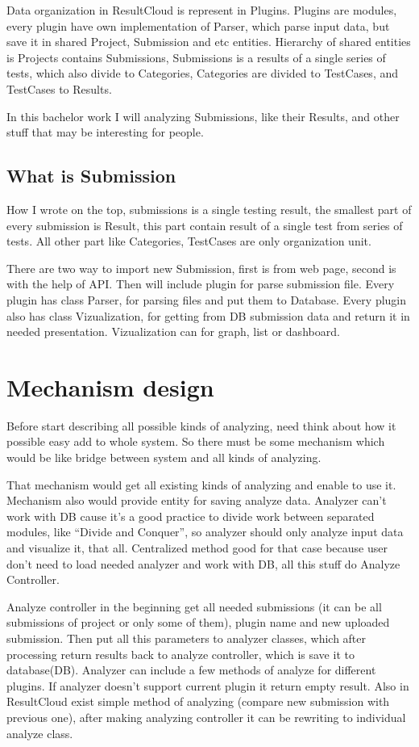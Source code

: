 \documentclass[a4paper,11pt]{article}
\begin{document}
Data organization in ResultCloud is represent in Plugins. Plugins are modules, every plugin have own implementation of Parser, which parse input data, but save it in shared Project, Submission and etc entities. Hierarchy of shared entities is Projects  contains Submissions, Submissions is a results of a single series of tests, which also divide to Categories, Categories are divided to TestCases, and TestCases to Results.

In this bachelor work I will analyzing Submissions, like their Results, and other stuff that may be interesting for people.

\subsection{What is Submission}

How I wrote on the top, submissions is a single testing result, the smallest part of every submission is Result, this part contain result of a single test from series of tests. All other part like Categories, TestCases are only organization unit. 

There are two way to import  new Submission, first is from web page, second is with the help of API. Then will include plugin for parse submission file. Every plugin has class Parser, for parsing files and put them to Database. Every plugin also has class Vizualization, for getting from DB submission data and return it in needed presentation. Vizualization can for graph, list or dashboard.  

\section{Mechanism design}

Before start describing all possible kinds of analyzing, need think about how it possible easy add to whole system. So there must be some mechanism which would be like bridge between system and all kinds of analyzing.

That mechanism would get all existing kinds of analyzing and enable to use it. Mechanism also would provide entity for saving analyze data. Analyzer can't work with DB cause it's a good practice to divide work between separated modules, like “Divide and Conquer”, so analyzer should only analyze input data and visualize it, that all. Centralized method good for that case because user don't need to load needed analyzer and work with DB, all this stuff do Analyze Controller.

Analyze controller in the beginning get all needed submissions (it can be all submissions of project or only some of them), plugin name and new uploaded submission. Then put all this parameters to analyzer classes, which after processing return results back to analyze controller, which is save it to database(DB). Analyzer can include a few methods of analyze for different plugins. If analyzer doesn't support current plugin it return empty result. Also in ResultCloud exist simple method of analyzing (compare new submission with previous one), after making analyzing controller it can be rewriting to individual analyze class.
\end{document}
